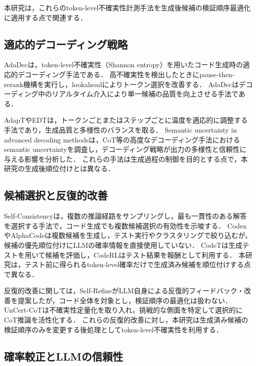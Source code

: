 \documentclass[submit,techrep,noauthor]{ipsj}
\begin{document}
本研究は，これらのtoken-level不確実性計測手法を生成後候補の検証順序最適化に適用する点で関連する．

\subsection{適応的デコーディング戦略}

AdaDec\cite{adadec2025}は，token-level不確実性（Shannon entropy）を用いたコード生成時の適応的デコーディング手法である．
高不確実性を検出したときにpause-then-rerank機構を実行し，lookaheadによりトークン選択を改善する．
AdaDecはデコーディング中のリアルタイム介入により単一候補の品質を向上させる手法である．

AdapT\cite{adapt2023}やEDT\cite{edt2024}は，トークンごとまたはステップごとに温度を適応的に調整する手法であり，生成品質と多様性のバランスを取る．
Semantic uncertainty in advanced decoding methods\cite{semantic_uncertainty_decoding2025}は，CoT等の高度なデコーディング手法におけるsemantic uncertaintyを調査し，デコーディング戦略が出力の多様性と信頼性に与える影響を分析した．
これらの手法は生成過程の制御を目的とする点で，本研究の生成後順位付けとは異なる．

\subsection{候補選択と反復的改善}

Self-Consistency\cite{wang2023selfconsistency}は，複数の推論経路をサンプリングし，最も一貫性のある解答を選択する手法で，コード生成でも複数候補選択の有効性を示唆する．
Codex\cite{chen2021codex}やAlphaCode\cite{li2022alphacode}は複数候補を生成し，テスト実行やクラスタリングで絞り込むが，候補の優先順位付けにLLMの確率情報を直接使用していない．
CodeT\cite{chen2022codet}は生成テストを用いて候補を評価し，CodeRL\cite{le2022coderl}はテスト結果を報酬として利用する．
本研究は，テスト前に得られるtoken-level確率だけで生成済み候補を順位付けする点で異なる．

反復的改善に関しては，Self-Refine\cite{madaan2023selfrefine}がLLM自身による反復的フィードバック・改善を提案したが，コード全体を対象とし，検証順序の最適化は扱わない．
UnCert-CoT\cite{uncert_cot2025}は不確実性定量化を取り入れ，挑戦的な側面を特定して選択的にCoT推論を活性化する．
これらの反復的改善に対し，本研究は生成済み候補の検証順序のみを変更する後処理としてtoken-level不確実性を利用する．

\subsection{確率較正とLLMの信頼性}
\end{document}

